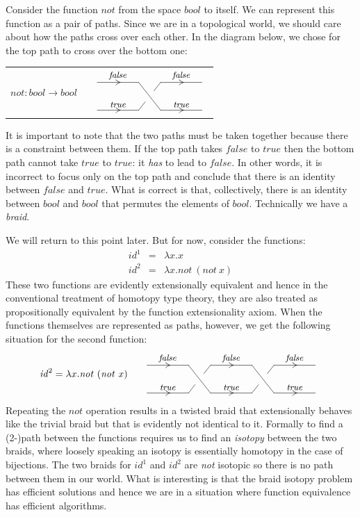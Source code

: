 \documentclass[11pt]{article}
\makeatletter
\def\wirechart#1#2{\let\labelstyle\objectstyle\xy*[*1.0]\xybox{\small%
\xymatrix@C=10mm@R=4mm#1{#2}}\endxy}
\def\wire#1#2{\ar@{-}[#1]^<>(.5){#2}}
\def\wireright#1#2{\wire{#1}{#2}\ar@{}[#1]|<>(.5)/.6ex/{\dir2{>}}}
\def\wwblank#1{*=<#1,0mm>{~}}
\def\blank{\wwblank{8mm}}
\def\wirecross#1{\save[]!L;[#1]!R**@{-}\restore}
\def\wirebraid#1#2{\save[]!L;[#1]!R**{}?(#2)**@{-}\restore\save[#1]!R;[]!L**{}?(#2)**@{-}\restore}
\newcommand{\boolt}{\mathit{bool}}
\newcommand{\ffv}{\mathit{false}}
\newcommand{\ttv}{\mathit{true}}
\newcommand{\notb}{\mathit{not}}
\newcommand{\idc}{\mathit{id}}
\makeatother
\begin{document}
Consider the function $\notb$ from the space $\boolt$ to itself. We can
represent this function as a pair of paths. Since we are in a topological
world, we should care about how the paths cross over each other.  In the
diagram below, we chose for the top path to cross over the bottom one:
\begin{center}
  \begin{tabular}{@{}llc@{}}
    $\notb : \boolt \rightarrow \boolt$ & & 
    $\vcenter{\wirechart{@C=1.5cm@R=0.8cm}{
        *{}\wireright{r}{\ffv}&\blank\wirecross{d}\wireright{r}{\ffv}&\\
        *{}\wireright{r}{\ttv}&\blank\wirebraid{u}{.3}\wireright{r}{\ttv}&
        }}$ 
  \end{tabular}
\end{center}
It is important to note that the two paths must be taken together
because there is a constraint between them. If the top path takes $\ffv$ to
$\ttv$ then the bottom path cannot take $\ttv$ to $\ttv$: it \emph{has} to
lead to $\ffv$. In other words, it is incorrect to focus only on the top path
and conclude that there is an identity between $\ffv$ and $\ttv$. What is
correct is that, collectively, there is an identity between $\boolt$ and
$\boolt$ that permutes the elements of $\boolt$. Technically we have a
\emph{braid}. 

We will return to this point later. But for now, consider the functions:
\[\begin{array}{rcl}
\idc^1 &=& \lambda x.x \\
\idc^2 &=& \lambda x. \notb~(\notb~x)
\end{array}\]
These two functions are evidently extensionally equivalent and hence in the
conventional treatment of homotopy type theory, they are also treated as
propositionally equivalent by the function extensionality axiom. When the
functions themselves are represented as paths, however, we get the following
situation for the second function:
\[
\idc^2 = \lambda x.\notb~(\notb~x) \qquad
\vcenter{\wirechart{@C=1.5cm@R=0.8cm}{
    *{}\wireright{r}{\ffv}&
    \blank\wirecross{d}\wireright{r}{\ffv}&
    \blank\wirecross{d}\wireright{r}{\ffv}&
    \\
    *{}\wireright{r}{\ttv}&
    \blank\wirebraid{u}{.3}\wireright{r}{\ttv}&
    \blank\wirebraid{u}{.3}\wireright{r}{\ttv}&
    \\
    }}
\]
Repeating the $\notb$ operation results in a twisted braid that extensionally
behaves like the trivial braid but that is evidently not identical to
it. Formally to find a (2-)path between the functions requires us to find an
\emph{isotopy} between the two braids, where loosely speaking an isotopy is
essentially homotopy in the case of bijections. The two braids for $\idc^1$
and $\idc^2$ are \emph{not} isotopic so there is no path between them in our
world. What is interesting is that the braid isotopy problem has efficient
solutions and hence we are in a situation where function equivalence has
efficient algorithms.
\end{document}
